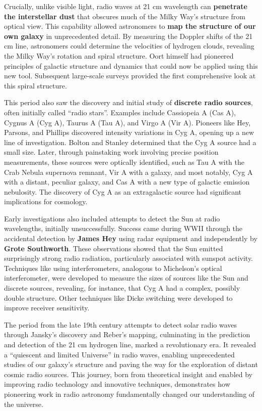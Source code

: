 \documentclass{../template/texnote}
\begin{document}
Crucially, unlike visible light, radio waves at 21 cm wavelength can \textbf{penetrate the interstellar dust} that obscures much of the Milky Way's structure from optical view.
This capability allowed astronomers to \textbf{map the structure of our own galaxy} in unprecedented detail.
By measuring the Doppler shifts of the 21 cm line, astronomers could determine the velocities of hydrogen clouds, revealing the Milky Way's rotation and spiral structure.
Oort himself had pioneered principles of galactic structure and dynamics that could now be applied using this new tool.
Subsequent large-scale surveys provided the first comprehensive look at this spiral structure.

This period also saw the discovery and initial study of \textbf{discrete radio sources}, often initially called ``radio stars''.
Examples include Cassiopeia A (Cas A), Cygnus A (Cyg A), Taurus A (Tau A), and Virgo A (Vir A).
Pioneers like Hey, Parsons, and Phillips discovered intensity variations in Cyg A, opening up a new line of investigation.
Bolton and Stanley determined that the Cyg A source had a small size.
Later, through painstaking work involving precise position measurements, these sources were optically identified, such as Tau A with the Crab Nebula supernova remnant, Vir A with a galaxy, and most notably, Cyg A with a distant, peculiar galaxy, and Cas A with a new type of galactic emission nebulosity.
The discovery of Cyg A as an extragalactic source had significant implications for cosmology.

Early investigations also included attempts to detect the Sun at radio wavelengths, initially unsuccessfully.
Success came during WWII through the accidental detection by \textbf{James Hey} using radar equipment and independently by \textbf{Grote Southworth}.
These observations showed that the Sun emitted surprisingly strong radio radiation, particularly associated with sunspot activity.
Techniques like using interferometers, analogous to Michelson's optical interferometer, were developed to measure the sizes of sources like the Sun and discrete sources, revealing, for instance, that Cyg A had a complex, possibly double structure.
Other techniques like Dicke switching were developed to improve receiver sensitivity.

The period from the late 19th century attempts to detect solar radio waves through Jansky's discovery and Reber's mapping, culminating in the prediction and detection of the 21 cm hydrogen line, marked a revolutionary era.
It revealed a ``quiescent and limited Universe'' in radio waves, enabling unprecedented studies of our galaxy's structure and paving the way for the exploration of distant cosmic radio sources.
This journey, born from theoretical insight and enabled by improving radio technology and innovative techniques, demonstrates how pioneering work in radio astronomy fundamentally changed our understanding of the universe.
\end{document}

